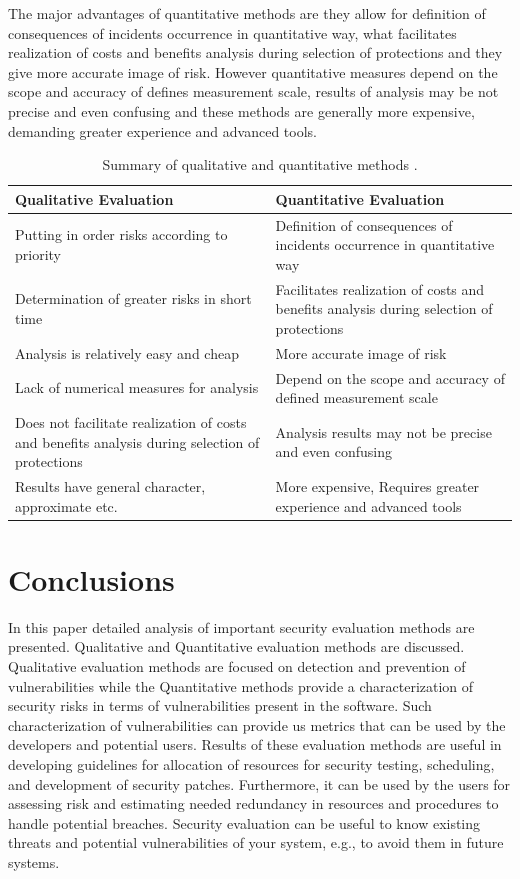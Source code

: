 \documentclass[pdftex,english,oribibl]{llncs}
\begin{document}
The major advantages of quantitative methods are they allow for definition of consequences of incidents occurrence in quantitative way, what facilitates realization of costs and benefits analysis during selection of protections and they give more accurate image of risk. However quantitative measures depend on the scope and accuracy of defines measurement scale, results of analysis may be not precise and even confusing and these methods are generally more expensive, demanding greater experience and advanced tools.

\begin{table}[ht]
	\centering\small
	\caption{Summary of qualitative and quantitative methods \cite{Rot_itrisk}.}
	\label{table:1}
		\begin{tabular}{p{2in}|p{2in}}
			\toprule
			Qualitative Evaluation & Quantitative Evaluation \\
			\midrule
			Putting in order risks according to priority
			 & Definition of consequences of incidents occurrence in quantitative way \\ 
			Determination of greater risks in short time
			 & Facilitates realization of costs and benefits analysis during selection of protections \\
			Analysis is relatively easy and cheap
			 & More accurate image of risk \\ 
			Lack of numerical measures for analysis
			& Depend on the scope and accuracy of defined measurement scale \\ 
			Does not facilitate realization of costs and benefits analysis during selection of protections
			& Analysis results may not be precise and even confusing \\ 
			Results have general character, approximate etc.
			& More expensive, Requires greater experience and advanced tools \\ 
			\bottomrule
		\end{tabular}
\end{table}
	
\section{Conclusions}\label{sec:conclusions}
In this paper detailed analysis of important security evaluation methods are presented. Qualitative and Quantitative evaluation methods are discussed. Qualitative evaluation methods are focused on detection and prevention of vulnerabilities while the Quantitative methods provide a characterization of security risks in terms of vulnerabilities present in the software. Such characterization of vulnerabilities can provide us metrics that can be used by the developers and potential users. Results of these evaluation methods are useful in developing guidelines for allocation of resources for security testing, scheduling, and development of security patches. Furthermore, it can be used by the users for assessing risk and estimating needed redundancy in resources and procedures to handle potential breaches. Security evaluation can be useful to know existing threats and potential vulnerabilities of your system, e.g., to avoid them in future systems. 
\end{document}
